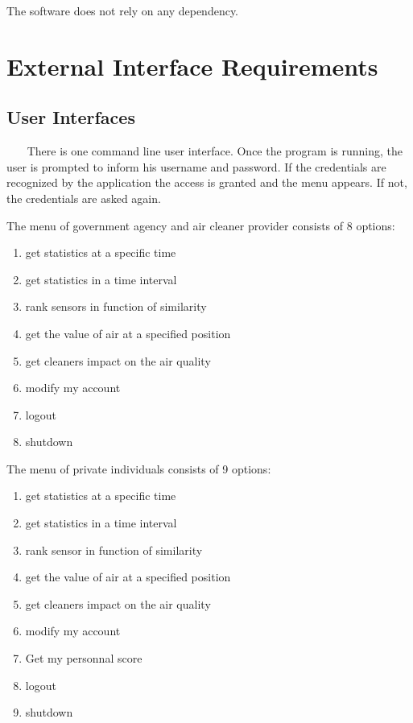 \documentclass{report}
\begin{document}
The software does not rely on any dependency.


\chapter{External Interface Requirements}

\section{User Interfaces} ~~~
There is one command line user interface. Once the program is running, the user
is prompted to inform his username and password. If the credentials are recognized
by the application the access is granted and the menu appears. If not, the
credentials are asked again.

The menu of government agency and air cleaner provider consists of 8 options:
\begin{enumerate}
	\item get statistics at a specific time
	\item get statistics in a time interval
	\item rank sensors in function of similarity
	\item get the value of air at a specified position
	\item get cleaners impact on the air quality
	\item modify my account
	\item logout
	\item shutdown
\end{enumerate}

The menu of private individuals consists of 9 options:
\begin{enumerate}
	\item get statistics at a specific time
	\item get statistics in a time interval
	\item rank sensor in function of similarity
	\item get the value of air at a specified position
	\item get cleaners impact on the air quality
	\item modify my account
	\item Get my personnal score
	\item logout
	\item shutdown
\end{enumerate}
\end{document}
